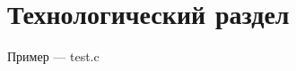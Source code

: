 \chapter{Технологический раздел}
\label{cha:impl}


\begin{listing}[H]
\caption{Пример — test.c} 
\end{listing}
\label{lst:c}


